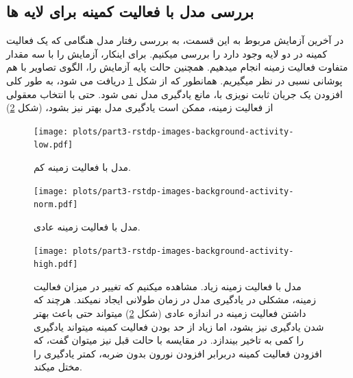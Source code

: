     \subsection{بررسی مدل با فعالیت کمینه برای لایه ها}
        در آخرین آزمایش مربوط به این قسمت، به بررسی رفتار مدل هنگامی که یک فعالیت کمینه در دو لایه وجود دارد را بررسی میکنیم. برای اینکار، آزمایش را با سه مقدار متفاوت فعالیت زمینه انجام میدهیم. همچنین حالت پایه آزمایش را، الگوی تصاویر با هم پوشانی نسبی در نظر میگیریم.
        همانطور که از شکل
        \ref{fig:part3-rstdp-images-background-activity-low}
        دریافت می شود، به طور کلی افزودن یک جریان ثابت نویزی با، مانع یادگیری مدل نمی شود. حتی با انتخاب معقولی از فعالیت زمینه، ممکن است یادگیری مدل بهتر نیز بشود،
        (شکل \ref{fig:part3-rstdp-images-background-activity-norm})

        \begin{figure}[!ht]
            \centering
            \texttt{[image: plots/part3-rstdp-images-background-activity-low.pdf]} 
            \caption{مدل با فعالیت زمینه کم.}
            \label{fig:part3-rstdp-images-background-activity-low}
        \end{figure}
        \begin{figure}[!ht]
            \centering
            \texttt{[image: plots/part3-rstdp-images-background-activity-norm.pdf]}
            \caption{مدل با فعالیت زمینه عادی.}
            \label{fig:part3-rstdp-images-background-activity-norm}
        \end{figure}
        \begin{figure}[H]
            \centering
            \texttt{[image: plots/part3-rstdp-images-background-activity-high.pdf]}
            \caption{مدل با فعالیت زمینه زیاد.
            مشاهده میکنیم که تغییر در میزان فعالیت زمینه، مشکلی در یادگیری مدل در زمان طولانی ایجاد نمیکند. هرچند که داشتن فعالیت زمینه در اندازه عادی
            (شکل \ref{fig:part3-rstdp-images-background-activity-norm})
            میتواند حتی باعث بهتر شدن یادگیری نیز بشود، اما زیاد از حد بودن فعالیت کمینه میتواند یادگیری را کمی به تاخیر بیندازد. در مقایسه با حالت قبل نیز میتوان گفت، که افزودن فعالیت کمینه دربرابر افزودن نورون بدون ضربه، کمتر یادگیری را مختل میکند.
            \label{fig:part3-rstdp-images-background-activity-high}}
        \end{figure}
